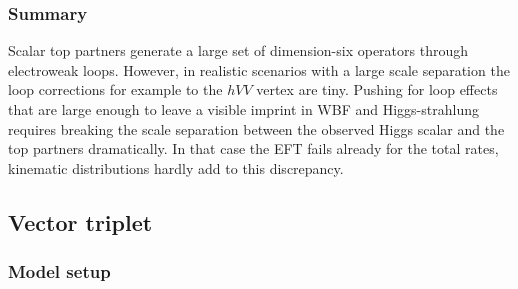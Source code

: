 \subsubsection{Summary}

Scalar top partners generate a large set of dimension-six operators
through electroweak loops. However, in realistic scenarios with a
large scale separation the loop corrections for example to the $hVV$
vertex are tiny.  Pushing for loop effects that are large enough to
leave a visible imprint in WBF and Higgs-strahlung requires breaking
the scale separation between the observed Higgs scalar and the top
partners dramatically. In that case the EFT fails already for the
total rates, kinematic distributions hardly add to this discrepancy.



\subsection{Vector triplet}
\label{sec:validity_triplet}

\subsubsection{Model setup}

